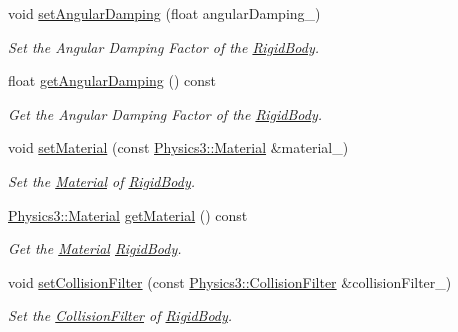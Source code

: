 \begin{DoxyCompactItemize}
void \hyperlink{class_magnum_1_1_physics3_1_1_vehicle_a7533ca488fdf87c8735b6d859ec59948}{set\+Angular\+Damping} (float angular\+Damping\+\_\+)
\begin{DoxyCompactList}\small\item\em Set the Angular Damping Factor of the \hyperlink{class_magnum_1_1_physics3_1_1_rigid_body}{Rigid\+Body}. \end{DoxyCompactList}\item 
float \hyperlink{class_magnum_1_1_physics3_1_1_vehicle_a2b46af31be7f435edd68a42f381310a9}{get\+Angular\+Damping} () const 
\begin{DoxyCompactList}\small\item\em Get the Angular Damping Factor of the \hyperlink{class_magnum_1_1_physics3_1_1_rigid_body}{Rigid\+Body}. \end{DoxyCompactList}\item 
void \hyperlink{class_magnum_1_1_physics3_1_1_vehicle_ac9f51ca1fed58fe59fcbca97797331e8}{set\+Material} (const \hyperlink{class_magnum_1_1_physics3_1_1_material}{Physics3\+::\+Material} \&material\+\_\+)
\begin{DoxyCompactList}\small\item\em Set the \hyperlink{class_magnum_1_1_physics3_1_1_material}{Material} of \hyperlink{class_magnum_1_1_physics3_1_1_rigid_body}{Rigid\+Body}. \end{DoxyCompactList}\item 
\hyperlink{class_magnum_1_1_physics3_1_1_material}{Physics3\+::\+Material} \hyperlink{class_magnum_1_1_physics3_1_1_vehicle_a58ef92b0e85c4add856b8ffbef687494}{get\+Material} () const 
\begin{DoxyCompactList}\small\item\em Get the \hyperlink{class_magnum_1_1_physics3_1_1_material}{Material} \hyperlink{class_magnum_1_1_physics3_1_1_rigid_body}{Rigid\+Body}. \end{DoxyCompactList}\item 
void \hyperlink{class_magnum_1_1_physics3_1_1_vehicle_a85f899ae2ea367efa89f29c6e1adad5e}{set\+Collision\+Filter} (const \hyperlink{class_magnum_1_1_physics3_1_1_collision_filter}{Physics3\+::\+Collision\+Filter} \&collision\+Filter\+\_\+)
\begin{DoxyCompactList}\small\item\em Set the \hyperlink{class_magnum_1_1_physics3_1_1_collision_filter}{Collision\+Filter} of \hyperlink{class_magnum_1_1_physics3_1_1_rigid_body}{Rigid\+Body}. \end{DoxyCompactList}\item 

\end{DoxyCompactItemize}
